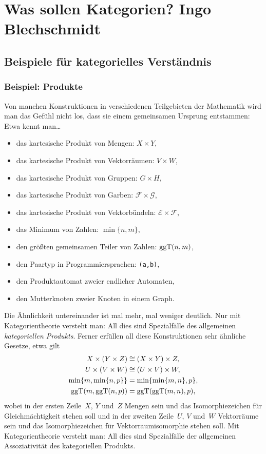 \section[Was sollen Kategorien?]{Was sollen Kategorien? \hfill \small Ingo
Blechschmidt}

\subsection{Beispiele für kategorielles Verständnis}

\subsubsection*{Beispiel: Produkte}

Von manchen Konstruktionen in verschiedenen Teilgebieten der Mathematik wird
man das Gefühl nicht los, dass sie einem gemeinsamen Ursprung entstammen: Etwa
kennt man\ldots
\begin{itemize}
  \item das kartesische Produkt von Mengen: $X \times Y$,
  \item das kartesische Produkt von Vektorräumen: $V \times W$,
  \item das kartesische Produkt von Gruppen: $G \times H$,
  \item das kartesische Produkt von Garben: $\mathcal{F} \times \mathcal{G}$,
  \item das kartesische Produkt von Vektorbündeln: $\mathcal{E} \times \mathcal{F}$,
  \item das Minimum von Zahlen: $\min\{n,m\}$,
  \item den größten gemeinsamen Teiler von Zahlen: $\operatorname{ggT}(n,m)$,
  \item den Paartyp in Programmiersprachen: \texttt{(a,b)},
  \item den Produktautomat zweier endlicher Automaten,
  \item den Mutterknoten zweier Knoten in einem Graph.
\end{itemize}
Die Ähnlichkeit untereinander ist mal mehr, mal weniger deutlich. Nur mit
Kategorientheorie versteht man: All dies sind Spezialfälle des allgemeinen
\emph{kategoriellen Produkts}. Ferner erfüllen all diese Konstruktionen sehr
ähnliche Gesetze, etwa gilt
\begin{align*}
  X \times (Y \times Z) &\cong (X \times Y) \times Z, \\
  U \times (V \times W) &\cong (U \times V) \times W, \\
  \min\{m,\min\{n,p\}\} &= \min\{\min\{m,n\},p\}, \\
  \operatorname{ggT}(m,\operatorname{ggT}(n,p)) &= \operatorname{ggT}(\operatorname{ggT}(m,n),p),
\end{align*}
wobei in der ersten Zeile~$X$, $Y$ und~$Z$ Mengen sein und das
Isomorphiezeichen für Gleichmächtigkeit stehen soll und in der zweiten
Zeile~$U$, $V$ und~$W$ Vektorräume sein und das Isomorphiezeichen für
Vektorraumisomorphie stehen soll. Mit Kategorientheorie versteht man:
All dies sind Spezialfälle der allgemeinen Assoziativität des kategoriellen
Produkts.

